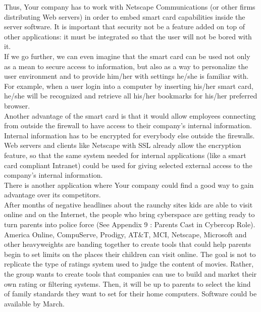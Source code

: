 Thus, Your company has to work with Netscape Communications (or other firms
distributing Web servers) in order to embed smart card capabilities inside
the server software. It is important that security not be a feature added
on top of other applications: it must be integrated so that the user will
not be bored with it.\\

If we go further, we can even imagine that the smart card can be used
not only as a mean to secure access to information, but also as a way
to personalize the user environment and to provide him/her with
settings he/she is familiar with. For example, when a user login into a
computer by inserting his/her smart card, he/she will be recognized and
retrieve all his/her bookmarks for his/her preferred browser.\\

Another advantage of the smart card is that it would allow employees
connecting from outside the firewall to have access to their company's
internal information. Internal information has to be encrypted for
everybody else outside the firewalls. Web servers and clients like Netscape
with SSL already allow the encryption feature, so that the same system
needed for internal applications (like a smart card compliant Intranet)
could be used for giving selected external access to the company's internal
information.\\

There is another application where Your company could find a good way to
gain advantage over its competitors.\\

After months of negative headlines about the raunchy sites kids are able to
visit online and on the Internet, the people who bring cyberspace are
getting ready to turn parents into police force (See Appendix 9
: Parents Cast in Cybercop Role). America Online,
CompuServe, Prodigy, AT\&T, MCI, Netscape, Microsoft and other heavyweights
are banding together to create tools that could help parents begin to set
limits on the places their children can visit online. The goal is not to
replicate the type of ratings system used to judge the content of movies.
Rather, the group wants to create tools that companies can use to build and
market their own rating or filtering systems. Then, it will be up to
parents to select the kind of family standards they want
to set for their home computers. Software could be available by March.\\

